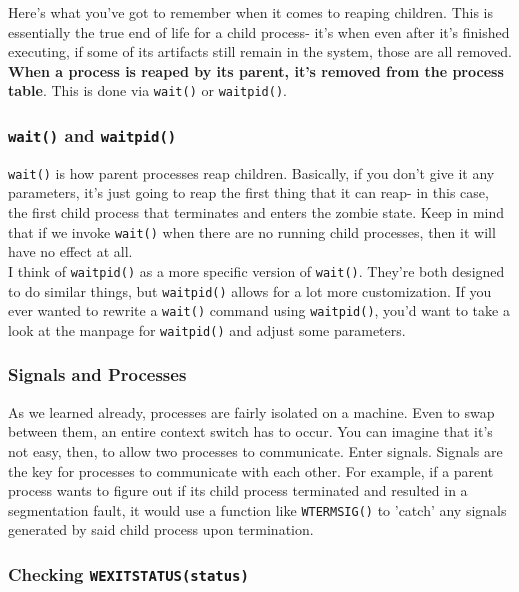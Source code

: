 \documentclass[english, 10pt]{article}
\begin{document}
Here's what you've got to remember when it comes to reaping children. This is essentially the true end of life for a child process- it's when even after it's finished executing, if some of its artifacts still remain in the system, those are all removed. \textbf{When a process is reaped by its parent, it's removed from the process table}. This is done via \texttt{wait()} or \texttt{waitpid()}.

\subsubsection{\texttt{wait()} and \texttt{waitpid()}}

\texttt{wait()} is how parent processes reap children. Basically, if you don't give it any parameters, it's just going to reap the first thing that it can reap- in this case, the first child process that terminates and enters the zombie state. Keep in mind that if we invoke \texttt{wait()} when there are no running child processes, then it will have no effect at all.\\

I think of \texttt{waitpid()} as a more specific version of \texttt{wait()}. They're both designed to do similar things, but \texttt{waitpid()} allows for a lot more customization. If you ever wanted to rewrite a \texttt{wait()} command using \texttt{waitpid()}, you'd want to take a look at the manpage for \texttt{waitpid()} and adjust some parameters.

\subsubsection{Signals and Processes}

As we learned already, processes are fairly isolated on a machine. Even to swap between them, an entire context switch has to occur. You can imagine that it's not easy, then, to allow two processes to communicate. Enter signals. Signals are the key for processes to communicate with each other. For example, if a parent process wants to figure out if its child process terminated and resulted in a segmentation fault, it would use a function like \texttt{WTERMSIG()} to 'catch' any signals generated by said child process upon termination.

\subsubsection{Checking \texttt{WEXITSTATUS(status)}}
\end{document}
